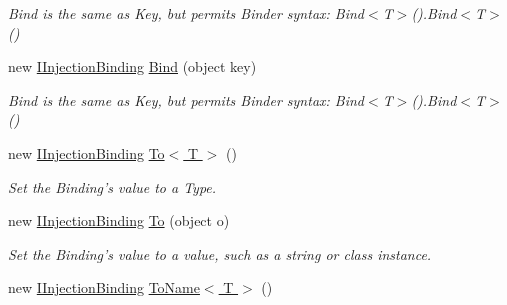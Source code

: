 \begin{DoxyCompactItemize}
\begin{DoxyCompactList}\small\item\em Bind is the same as Key, but permits Binder syntax\-: {\ttfamily Bind$<$T$>$().Bind$<$T$>$()} \end{DoxyCompactList}\item 
\hypertarget{interfacestrange_1_1extensions_1_1injector_1_1api_1_1_i_injection_binding_a15283f40aea160b30baa758ce6d48688}{new \hyperlink{interfacestrange_1_1extensions_1_1injector_1_1api_1_1_i_injection_binding}{I\-Injection\-Binding} \hyperlink{interfacestrange_1_1extensions_1_1injector_1_1api_1_1_i_injection_binding_a15283f40aea160b30baa758ce6d48688}{Bind} (object key)}\label{interfacestrange_1_1extensions_1_1injector_1_1api_1_1_i_injection_binding_a15283f40aea160b30baa758ce6d48688}

\begin{DoxyCompactList}\small\item\em Bind is the same as Key, but permits Binder syntax\-: {\ttfamily Bind$<$T$>$().Bind$<$T$>$()} \end{DoxyCompactList}\item 
\hypertarget{interfacestrange_1_1extensions_1_1injector_1_1api_1_1_i_injection_binding_a2a8f13fe155f789666ea077617b590e5}{new \hyperlink{interfacestrange_1_1extensions_1_1injector_1_1api_1_1_i_injection_binding}{I\-Injection\-Binding} \hyperlink{interfacestrange_1_1extensions_1_1injector_1_1api_1_1_i_injection_binding_a2a8f13fe155f789666ea077617b590e5}{To$<$ T $>$} ()}\label{interfacestrange_1_1extensions_1_1injector_1_1api_1_1_i_injection_binding_a2a8f13fe155f789666ea077617b590e5}

\begin{DoxyCompactList}\small\item\em Set the Binding's value to a Type. \end{DoxyCompactList}\item 
\hypertarget{interfacestrange_1_1extensions_1_1injector_1_1api_1_1_i_injection_binding_aa2830a784e57d14faf352312906fd7e5}{new \hyperlink{interfacestrange_1_1extensions_1_1injector_1_1api_1_1_i_injection_binding}{I\-Injection\-Binding} \hyperlink{interfacestrange_1_1extensions_1_1injector_1_1api_1_1_i_injection_binding_aa2830a784e57d14faf352312906fd7e5}{To} (object o)}\label{interfacestrange_1_1extensions_1_1injector_1_1api_1_1_i_injection_binding_aa2830a784e57d14faf352312906fd7e5}

\begin{DoxyCompactList}\small\item\em Set the Binding's value to a value, such as a string or class instance. \end{DoxyCompactList}\item 
\hypertarget{interfacestrange_1_1extensions_1_1injector_1_1api_1_1_i_injection_binding_a4763a32616ef321b606457b12685fcf4}{new \hyperlink{interfacestrange_1_1extensions_1_1injector_1_1api_1_1_i_injection_binding}{I\-Injection\-Binding} \hyperlink{interfacestrange_1_1extensions_1_1injector_1_1api_1_1_i_injection_binding_a4763a32616ef321b606457b12685fcf4}{To\-Name$<$ T $>$} ()}\label{interfacestrange_1_1extensions_1_1injector_1_1api_1_1_i_injection_binding_a4763a32616ef321b606457b12685fcf4}


\end{DoxyCompactItemize}
